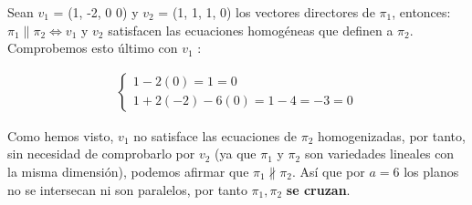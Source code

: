 Sean $v_1$ = (1, -2, 0 0) y $v_2$ = (1, 1, 1, 0) los vectores directores de $\pi_1$, entonces: \\
$\pi_1 \parallel \pi_2 \Longleftrightarrow v_1$ y $v_2$ satisfacen las ecuaciones homogéneas que definen a $\pi_2$. Comprobemos esto último con $v_1$ :

\begin{gather*}
    \begin{cases}
    1 - 2(0) = 1 = 0 \\
    1 + 2(-2) - 6(0) = 1 - 4 = -3 = 0
    \end{cases}
\end{gather*}

Como hemos visto, $v_1$ no satisface las ecuaciones de $\pi_2$ homogenizadas, por tanto, sin necesidad de comprobarlo por $v_2$ (ya que $\pi_1$ y $\pi_2$ son variedades lineales con la misma dimensión), podemos afirmar que $\pi_1 \nparallel \pi_2$. Así que por $a = 6$ los planos no se intersecan ni son paralelos, por tanto $\pi_1, \pi_2$ \textbf{se cruzan}.
